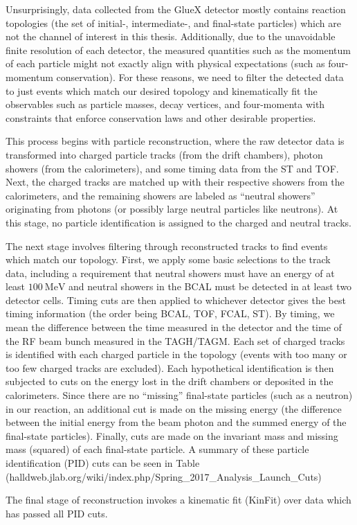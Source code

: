 Unsurprisingly, data collected from the GlueX detector mostly contains reaction topologies (the set of initial-, intermediate-, and final-state particles) which are not the channel of interest in this thesis. Additionally, due to the unavoidable finite resolution of each detector, the measured quantities such as the momentum of each particle might not exactly align with physical expectations (such as four-momentum conservation). For these reasons, we need to filter the detected data to just events which match our desired topology and kinematically fit the observables such as particle masses, decay vertices, and four-momenta with constraints that enforce conservation laws and other desirable properties.

This process begins with particle reconstruction, where the raw detector data is transformed into charged particle tracks (from the drift chambers), photon showers (from the calorimeters), and some timing data from the ST and TOF. Next, the charged tracks are matched up with their respective showers from the calorimeters, and the remaining showers are labeled as ``neutral showers'' originating from photons (or possibly large neutral particles like neutrons). At this stage, no particle identification is assigned to the charged and neutral tracks.

The next stage involves filtering through reconstructed tracks to find events which match our topology. First, we apply some basic selections to the track data, including a requirement that neutral showers must have an energy of at least $\SI{100}{\mega\eV}$ and neutral showers in the BCAL must be detected in at least two detector cells. Timing cuts are then applied to whichever detector gives the best timing information (the order being BCAL, TOF, FCAL, ST). By timing, we mean the difference between the time measured in the detector and the time of the RF beam bunch measured in the TAGH/TAGM. Each set of charged tracks is identified with each charged particle in the topology (events with too many or too few charged tracks are excluded). Each hypothetical identification is then subjected to cuts on the energy lost in the drift chambers or deposited in the calorimeters. Since there are no ``missing'' final-state particles (such as a neutron) in our reaction, an additional cut is made on the missing energy (the difference between the initial energy from the beam photon and the summed energy of the final-state particles). Finally, cuts are made on the invariant mass and missing mass (squared) of each final-state particle. A summary of these particle identification (PID) cuts can be seen in {\color{red} Table (halldweb.jlab.org/wiki/index.php/Spring_2017_Analysis_Launch_Cuts)}

The final stage of reconstruction invokes a kinematic fit (KinFit) over data which has passed all PID cuts.

